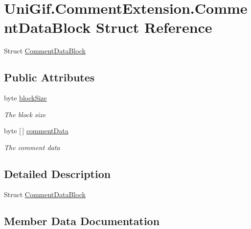 \hypertarget{struct_uni_gif_1_1_comment_extension_1_1_comment_data_block}{}\section{Uni\+Gif.\+Comment\+Extension.\+Comment\+Data\+Block Struct Reference}
\label{struct_uni_gif_1_1_comment_extension_1_1_comment_data_block}


Struct \hyperlink{struct_uni_gif_1_1_comment_extension_1_1_comment_data_block}{Comment\+Data\+Block}  


\subsection*{Public Attributes}
\begin{DoxyCompactItemize}
\item 
byte \hyperlink{struct_uni_gif_1_1_comment_extension_1_1_comment_data_block_aaf0811f8f5e60aa4525d176fde7ff6c0}{block\+Size}
\begin{DoxyCompactList}\small\item\em The block size \end{DoxyCompactList}\item 
byte \mbox{[}$\,$\mbox{]} \hyperlink{struct_uni_gif_1_1_comment_extension_1_1_comment_data_block_a7c64990ce578bb5473028decc8b1cef2}{comment\+Data}
\begin{DoxyCompactList}\small\item\em The comment data \end{DoxyCompactList}\end{DoxyCompactItemize}


\subsection{Detailed Description}
Struct \hyperlink{struct_uni_gif_1_1_comment_extension_1_1_comment_data_block}{Comment\+Data\+Block} 



\subsection{Member Data Documentation}
\mbox{\label{struct_uni_gif_1_1_comment_extension_1_1_comment_data_block_aaf0811f8f5e60aa4525d176fde7ff6c0}} 
